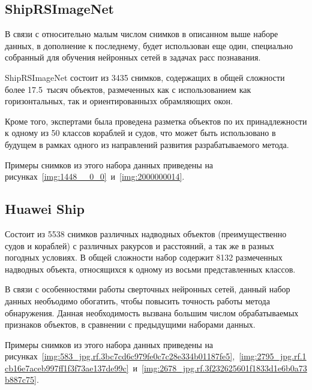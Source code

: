 
\subsection*{ShipRSImageNet}

В связи с относительно малым числом снимков в описанном выше наборе данных, в дополнение к последнему, будет использован еще один, специально собранный для обучения нейронных сетей в задачах расс познавания.

ShipRSImageNet состоит из 3435 снимков, содержащих в общей сложности более 17.5~тысяч объектов, размеченных как с использованием как горизонтальных, так и ориентированнызх обрамляющих окон. 

Кроме того, экспертами была проведена разметка объектов по их принадлежности к одному из 50 классов кораблей и судов, что может быть использовано в будущем в рамках одного из направлений развития разрабатываемого метода.

Примеры снимков из этого набора данных приведены на рисунках~\ref{img:1448__0_0}~и~\ref{img:2000000014}.



\subsection*{Huawei Ship}

Состоит из 5538 снимков различных надводных объектов (преимущественно судов и кораблей) с различных ракурсов и расстояний, а так же в разных погодных условиях. В общей сложности набор содержит 8132 размеченных надводных объекта, относящихся к одному из восьми представленных классов. 

В связи с особенностями работы сверточных нейронных сетей, данный набор данных необъодимо обогатить, чтобы повысить точность работы метода обнаружения. Данная необходимость вызвана большим числом обрабатываемых признаков объектов, в сравнении с предыдущими наборами данных.

Примеры снимков из этого набора данных приведены на рисунках~\ref{img:583_jpg.rf.3bc7cd6c979fe0c7c28e334b01187fe5},~\ref{img:2795_jpg.rf.1cb16e7aceb997ff1f3f73ae137de99c}~и~\ref{img:2678_jpg.rf.3f232625601f1833d1e6b0a73b887c75}.

